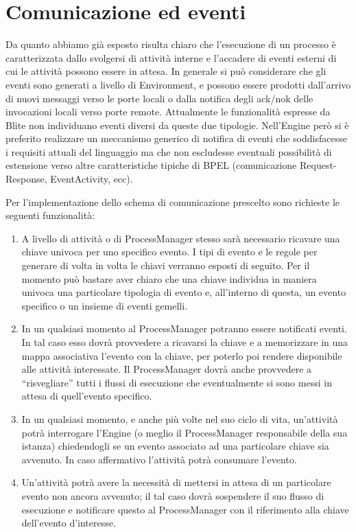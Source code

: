 \section{Comunicazione ed eventi}
\label{sec:comevent}
Da quanto abbiamo già esposto risulta chiaro che l'esecuzione di un processo \`e
caratterizzata dallo svolgersi di attività interne e l'accadere di eventi
esterni di cui le attività possono essere in attesa. In generale si può
considerare che gli eventi sono generati a livello di Environment, e possono
essere prodotti dall'arrivo di nuovi messaggi verso le porte locali o
dalla notifica degli ack/nok delle invocazioni locali
verso porte remote. Attualmente le funzionalità espresse da Blite non
individuano eventi diversi da queste due tipologie. Nell'Engine però si \`e
preferito realizzare un meccanismo generico di notifica di eventi che
soddisfacesse i requisiti attuali del linguaggio ma che non escludesse eventuali
possibilità di estensione verso altre caratteristiche tipiche di BPEL
(comunicazione Request-Response, EventActivity, ecc).

Per l'implementazione dello schema di comunicazione prescelto sono richieste
le seguenti funzionalità:

\begin{enumerate}
  \item A livello di attività o di ProcessManager stesso
  sarà necessario ricavare una chiave univoca per uno specifico 
  evento. I tipi di evento e le regole per generare di volta in
  volta le chiavi verranno esposti di seguito. Per il momento può bastare aver
  chiaro che una chiave individua in maniera univoca una particolare tipologia
  di evento e, all'interno di questa, un evento specifico o un insieme di eventi
  gemelli.
  
  \item In un qualsiasi momento al ProcessManager potranno essere notificati
  eventi. In tal caso esso dovrà provvedere a ricavarsi la chiave e a
  memorizzare in una mappa associativa l'evento con la chiave, per poterlo poi
  rendere disponibile alle attività interessate. Il ProcessManager dovrà anche
  provvedere a ``risvegliare'' tutti i flussi di esecuzione che
  eventualmente si sono messi in attesa di quell'evento specifico.
   
  \item In un qualsiasi momento, e anche più volte nel suo ciclo di vita,
  un'attività potrà interrogare l'Engine (o meglio il ProcessManager
  responsabile della sua istanza) chiedendogli se un evento associato ad una
  particolare chiave sia avvenuto. In caso affermativo l'attività potrà consumare l'evento.

  \item Un'attività potrà avere la necessità di mettersi in attesa di un
  particolare evento non ancora avvenuto; il tal caso dovrà sospendere il
  suo flusso di esecuzione e notificare questo al ProcessManager
  con il riferimento alla chiave dell'evento d'interesse. 
\end{enumerate}

